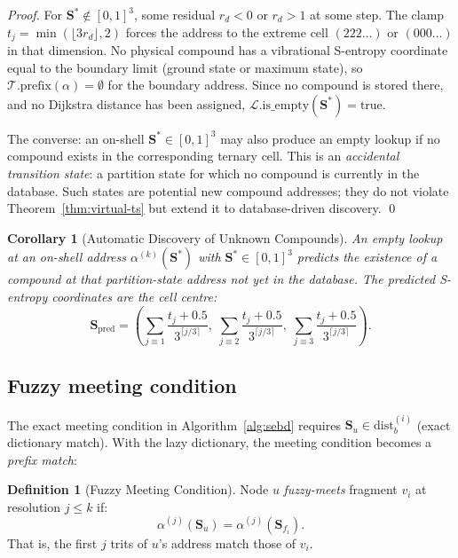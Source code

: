 \documentclass[twocolumn,10pt,a4paper]{article}
\theoremstyle{thmstyle}
\newtheorem{corollary}[theorem]{Corollary}
\theoremstyle{definition}
\newtheorem{definition}[theorem]{Definition}
\theoremstyle{remark}
\newcommand{\Sv}{\mathbf{S}}
\begin{document}
\begin{proof}
For $\Sv^* \notin [0,1]^3$, some residual $r_d < 0$ or $r_d > 1$ at
some step. The clamp $t_j = \min(\lfloor 3r_d\rfloor, 2)$ forces the
address to the extreme cell $(222\ldots)$ or $(000\ldots)$ in that
dimension. No physical compound has a vibrational S-entropy coordinate
equal to the boundary limit (ground state or maximum state), so
$\mathcal{T}.\text{prefix}(\alpha) = \emptyset$ for the boundary
address. Since no compound is stored there, and no Dijkstra distance
has been assigned, $\mathcal{L}.\text{is\_empty}(\Sv^*) = \text{true}$.

The converse: an on-shell $\Sv^* \in [0,1]^3$ may also produce an empty
lookup if no compound exists in the corresponding ternary cell. This is
an \emph{accidental transition state}: a partition state for which no
compound is currently in the database. Such states are potential new
compound addresses; they do not violate Theorem~\ref{thm:virtual-ts}
but extend it to database-driven discovery. \qed
\end{proof}

\begin{corollary}[Automatic Discovery of Unknown Compounds]
\label{cor:unknown}
An empty lookup at an on-shell address $\alpha^{(k)}(\Sv^*)$ with
$\Sv^* \in [0,1]^3$ predicts the existence of a compound at that
partition-state address not yet in the database. The predicted
S-entropy coordinates are the cell centre:
\begin{equation}
\Sv_\text{pred} = \left(\sum_{j \equiv 1} \frac{t_j + 0.5}{3^{\lceil j/3\rceil}},\;
\sum_{j \equiv 2} \frac{t_j + 0.5}{3^{\lceil j/3\rceil}},\;
\sum_{j \equiv 3} \frac{t_j + 0.5}{3^{\lceil j/3\rceil}}\right).
\label{eq:cell-centre}
\end{equation}
\end{corollary}

\subsection{Fuzzy meeting condition}

The exact meeting condition in Algorithm~\ref{alg:sebd} requires
$\Sv_u \in \text{dist}_b^{(i)}$ (exact dictionary match). With the
lazy dictionary, the meeting condition becomes a \emph{prefix match}:

\begin{definition}[Fuzzy Meeting Condition]
\label{def:fuzzy-meet}
Node $u$ \emph{fuzzy-meets} fragment $v_i$ at resolution $j \leq k$ if:
\begin{equation}
\alpha^{(j)}(\Sv_u) = \alpha^{(j)}(\Sv_{f_i}).
\label{eq:fuzzy-meet}
\end{equation}
That is, the first $j$ trits of $u$'s address match those of $v_i$.
\end{definition}
\end{document}
